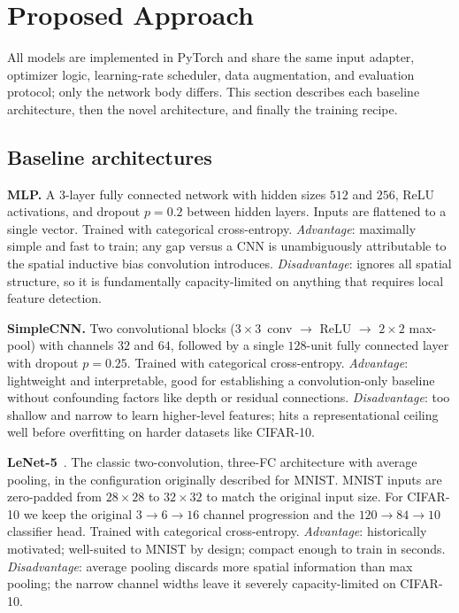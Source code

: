 \documentclass[conference,10pt]{IEEEtran}
\begin{document}
\section{Proposed Approach}
\label{sec:approach}

All models are implemented in PyTorch and share the same input
adapter, optimizer logic, learning-rate scheduler, data augmentation,
and evaluation protocol; only the network body differs. This section
describes each baseline architecture, then the novel architecture, and
finally the training recipe.

\subsection{Baseline architectures}

\noindent\textbf{MLP.} A 3-layer fully connected network with hidden
sizes $512$ and $256$, ReLU activations, and dropout $p\!=\!0.2$
between hidden layers. Inputs are flattened to a single vector.
Trained with categorical cross-entropy.
\textit{Advantage}: maximally simple and fast to train; any gap
versus a CNN is unambiguously attributable to the spatial inductive
bias convolution introduces.
\textit{Disadvantage}: ignores all spatial structure, so it
is fundamentally capacity-limited on anything that requires local
feature detection.

\noindent\textbf{SimpleCNN.} Two convolutional blocks
($3\!\times\!3$~conv $\to$ ReLU $\to$ $2\!\times\!2$ max-pool) with
channels $32$ and $64$, followed by a single $128$-unit fully
connected layer with dropout $p\!=\!0.25$. Trained with categorical
cross-entropy.
\textit{Advantage}: lightweight and interpretable, good for
establishing a convolution-only baseline without confounding factors
like depth or residual connections.
\textit{Disadvantage}: too shallow and narrow to learn
higher-level features; hits a representational ceiling well before
overfitting on harder datasets like CIFAR-10.

\noindent\textbf{LeNet-5}~\cite{lecun1989backprop,lecun1998gradient}.
The classic two-convolution, three-FC architecture with average
pooling, in the configuration originally described for MNIST. MNIST
inputs are zero-padded from $28\!\times\!28$ to $32\!\times\!32$ to
match the original input size. For CIFAR-10 we keep the original
$3\!\to\!6\!\to\!16$ channel progression and the
$120\!\to\!84\!\to\!10$ classifier head. Trained with categorical
cross-entropy.
\textit{Advantage}: historically motivated; well-suited to MNIST by
design; compact enough to train in seconds.
\textit{Disadvantage}: average pooling discards more spatial
information than max pooling; the narrow channel widths leave it
severely capacity-limited on CIFAR-10.
\end{document}
